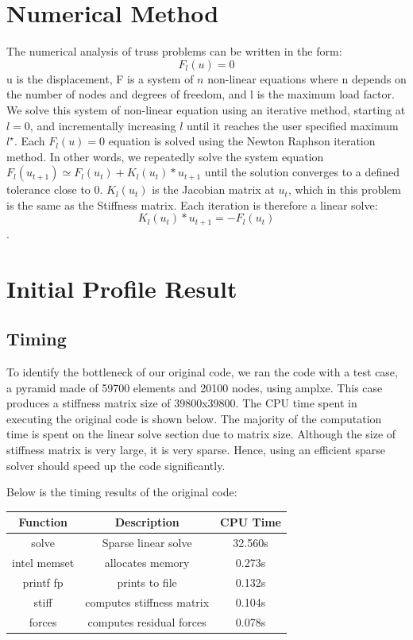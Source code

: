 \documentclass[11pt]{article}
\begin{document}
\section{Numerical Method}\label{sec:method}

The numerical analysis of truss problems can be written in the form:
$$F_l(u)=0$$
u is the displacement, F is a system of $n$ non-linear equations where n depends on the number of nodes and degrees of freedom, and l is the maximum load factor.\\

We solve this system of non-linear equation using an iterative method, starting at $l=0$, and incrementally increasing $l$ until it reaches the user specified maximum $l^{\star}$. Each $F_l(u)=0$ equation is solved using the Newton Raphson iteration method. In other words, we repeatedly solve the system equation $F_l(u_{t+1}) \simeq F_l(u_t) + K_l(u_t)*u_{t+1}$ until the solution converges to a defined tolerance close to 0. $K_l(u_t)$ is the Jacobian matrix at $u_t$, which in this problem is the same as the Stiffness matrix. Each iteration is therefore a linear solve:
$$K_l(u_t)*u_{t+1}=-F_l(u_t)$$.

\section{Initial Profile Result}\label{sec:profiling}

\subsection{Timing}
To identify the bottleneck of our original code, we ran the code with a test case, a pyramid made of 59700 elements and 20100 nodes, using amplxe. This case produces a stiffness matrix size of 39800x39800. The CPU time spent in executing the original code is shown below. The majority of the computation time is spent on the linear solve section due to matrix size. Although the size of stiffness matrix is very large, it is very sparse. Hence, using an efficient sparse solver should speed up the code significantly. 


Below is the timing results of the original code:

\begin{center}
	\begin{tabular}{||c c c ||} 
		\hline
		Function & Description & CPU Time \\ [0.5ex] 
		\hline\hline
		solve & Sparse linear solve & 32.560s  \\ 
		\hline
		intel memset  & allocates memory & 0.273s  \\
		\hline
		printf fp & prints to file & 0.132s  \\
		\hline
		stiff & computes stiffness matrix & 0.104s  \\
		\hline
		forces & computes residual forces & 0.078s  \\[1ex] 
		\hline
	\end{tabular}
\end{center}
\end{document}
